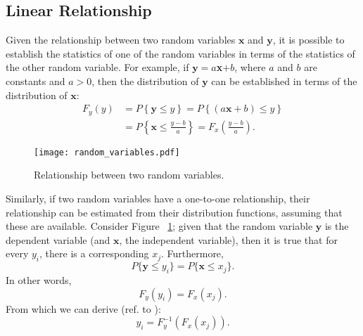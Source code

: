 \subsection{Linear Relationship}
Given the relationship between two random variables $\textbf{x}$ and $\textbf{y}$, it is possible to establish the statistics of one of the random variables in terms of the statistics of the other random variable. For example, if $\textbf{y} =  a$\textbf{x}$ + b$, where $a$ and $b$ are constants and $a > 0$, then the distribution of $\textbf{y}$ can be established in terms of the distribution of $\textbf{x}$:
\begin{align}
    \label{eq:rel_1}
    F_y(y) & = P\left \{ \mathbf{y} \leq y \right \} = P\left \{ \left (a\mathbf{x} + b  \right ) \leq y \right \} \\ \nonumber
           & = P\left \{ \mathbf{x} \leq \frac{y - b}{a}  \right\}
           =  F_x \left (  \frac{y - b}{a}  \right ).
\end{align}

\begin{figure}
	\centering
	\texttt{[image: random\_variables.pdf]}
	\caption{Relationship between two random variables.}
	\label{fig:random_variables}
\end{figure}

Similarly, if two random variables have a one-to-one relationship, their relationship can be estimated from their distribution functions, assuming that these are available. Consider Figure ~\ref{fig:random_variables}; given that the random variable $\mathbf{y}$ is the dependent variable (and $\mathbf{x}$, the independent variable), then it is true that for every $y_i$, there is a corresponding $x_j$. Furthermore,
\begin{equation}
    \label{eq:rel_2}
     P\{\mathbf{y} \leq y_i \} = P\{\mathbf{x} \leq x_j \}.
\end{equation}
In other words,
\begin{equation}
    \label{eq:rel_3}
    F_y(y_i) = F_x(x_j).
\end{equation}
From which we can derive (ref. to \cite{dargie2014stochastic}):
\begin{equation}
    \label{eq:rel_4}
    y_i = F^{-1}_y \left (F_x(x_j) \right ).
\end{equation}

